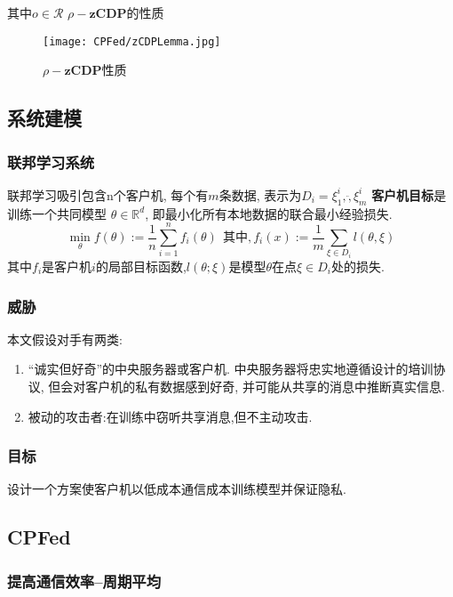 其中$o \in \mathcal{R}$
$\rho-\textbf{zCDP}$的性质

\begin{figure}[ht]
    \setlength{\abovecaptionskip}{0.1cm}
    \centering    
    \texttt{[image: CPFed/zCDPLemma.jpg]}
    \caption{$\rho-\textbf{zCDP}$性质}
\end{figure}

\subsection{系统建模}
\subsubsection{联邦学习系统}
联邦学习吸引包含n个客户机, 每个有$m$条数据, 表示为$D_i = {\xi^i_1, \ddot,\xi^i_m}$
\textbf{客户机目标}是训练一个共同模型 $\theta \in \mathbb{R}^d$, 即最小化所有本地数据的联合最小经验损失.
\begin{equation}
    \min_\theta f(\theta) := \frac{1}{n} \sum^n_{i=1}f_i(\theta) \ \  \text{其中},f_i(x) := \frac{1}{m}\sum_{\xi\in D_i} l(\theta , \xi ) 
\end{equation}
其中$f_i$是客户机$i$的局部目标函数,$l(\theta; \xi)$是模型$\theta $在点$\xi\in D_i $处的损失.

\subsubsection{威胁}
本文假设对手有两类:
\begin{enumerate}
    \item “诚实但好奇”的中央服务器或客户机. 中央服务器将忠实地遵循设计的培训协议, 但会对客户机的私有数据感到好奇, 并可能从共享的消息中推断真实信息. 
    \item 被动的攻击者:在训练中窃听共享消息,但不主动攻击.
\end{enumerate}


\subsubsection{目标}
设计一个方案使客户机以低成本通信成本训练模型并保证隐私.

\subsection{CPFed}

\subsubsection{提高通信效率--周期平均}
